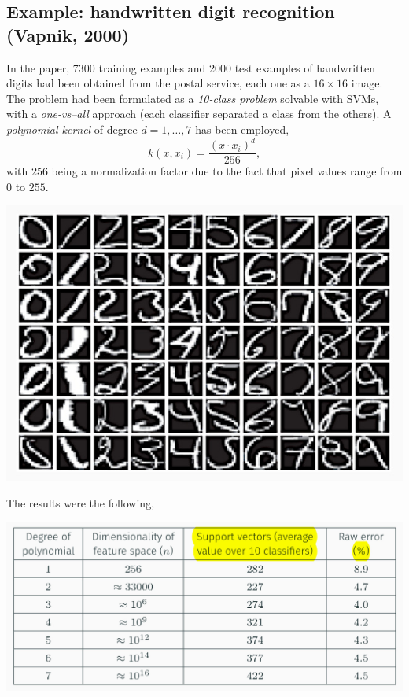 \documentclass[10pt]{report}
\begin{document}
\subsection{Example: handwritten digit recognition (Vapnik, 2000)}
\label{sec:orga777bd2}
In the paper, 7300 training examples and 2000 test examples of handwritten
digits had been obtained from the postal service, each one as a \(16 \times 16\)
image. The problem had been formulated as a \emph{10\--class problem} solvable with
SVMs, with a \emph{one\--vs--all} approach (each classifier separated a class from
the others). A \emph{polynomial kernel} of degree \(d=1,\dots,7\) has been employed,
$$k(x, x_i) = \frac{(x\cdot x_i)^d}{256},$$ with \(256\) being a normalization
factor due to the fact that pixel values range from \(0\) to \(255\).

\begin{center}
\includegraphics[width=.9\linewidth]{./pics/svm/vapnik1.jpg}
\end{center}

The results were the following,

\begin{center}
\includegraphics[width=.9\linewidth]{./pics/svm/vapnik2.jpg}
\end{center}
\end{document}
